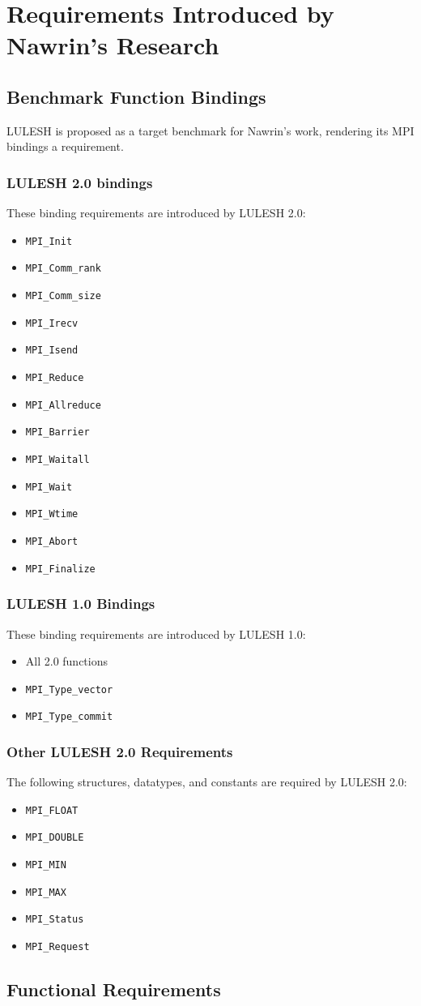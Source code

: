 \documentclass{article}
\newcommand{\itemtt}[1]{\item \texttt{#1}}
\begin{document}
\section{Requirements Introduced by Nawrin's Research}

\subsection{Benchmark Function Bindings}

LULESH is proposed as a target benchmark for Nawrin's work, rendering its MPI bindings a requirement.

\subsubsection{LULESH 2.0 bindings}
These binding requirements are introduced by LULESH 2.0:
\begin{itemize}
\itemtt{MPI\_Init}
\itemtt{MPI\_Comm\_rank}
\itemtt{MPI\_Comm\_size}
\itemtt{MPI\_Irecv}
\itemtt{MPI\_Isend}
\itemtt{MPI\_Reduce}
\itemtt{MPI\_Allreduce}
\itemtt{MPI\_Barrier}
\itemtt{MPI\_Waitall}
\itemtt{MPI\_Wait}
\itemtt{MPI\_Wtime}
\itemtt{MPI\_Abort}
\itemtt{MPI\_Finalize}
\end{itemize}

\subsubsection{LULESH 1.0 Bindings}

These binding requirements are introduced by LULESH 1.0:
\begin{itemize}
\item All 2.0 functions
\itemtt{MPI\_Type\_vector}
\itemtt{MPI\_Type\_commit}
\end{itemize}

\subsubsection{Other LULESH 2.0 Requirements}

The following structures, datatypes, and constants are required by LULESH 2.0:

\begin{itemize}
\itemtt{MPI\_FLOAT}
\itemtt{MPI\_DOUBLE}
\itemtt{MPI\_MIN}
\itemtt{MPI\_MAX}
\itemtt{MPI\_Status}
\itemtt{MPI\_Request}
\end{itemize}

\subsection{Functional Requirements}
\end{document}
